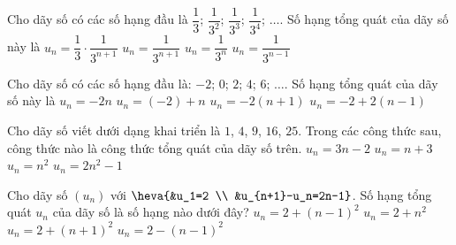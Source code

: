 \begin{ex}%
	Cho dãy  số có các số hạng đầu là
	$\dfrac{1}{3}$; $\dfrac{1}{3^2}$; $\dfrac{1}{3^3}$; $\dfrac{1}{3^4}$; $\ldots$. Số hạng tổng quát của  dãy số này là
	 \choice
		{$u_n=\dfrac{1}{3} \cdot  \dfrac{1}{3^{n+1}}$}
		{$u_n=\dfrac{1}{3^{n+1}}$} 
		 {\True $u_n=\dfrac{1}{3^n}$}
		 {$u_n=\dfrac{1}{3^{n-1}}$}
\end{ex}

\begin{ex}%
	Cho dãy số có các số hạng đầu là: $-2$; $0$; $2$; $4$; $6$; $\ldots$. Số hạng tổng quát  của dãy số này là
	\choice 
		 {$u_n=-2n$}
		{$u_n=(-2)+n$} 
		 {$u_n=-2(n+1)$}
		{\True  $u_n=-2+2(n-1)$}
\end{ex}

\begin{ex}%
	Cho dãy số viết dưới  dạng khai triển là $1$, $4$, $9$, $16$, $25$. Trong các công thức sau, công thức nào là công thức tổng quát của dãy số trên.
	\choice 
		{$u_n =  3n - 2$}
		{$u_n =  n + 3$}
		{\True $u_n = n^2$} 
		{$u_n = 2n^2 - 1$} 
\end{ex}

\begin{ex}%
	Cho  dãy số $(u_n)$ với $\heva{&u_1=2 \\ &u_{n+1}-u_n=2n-1}$. Số hạng tổng quát $u_n$ của dãy số là số hạng nào dưới đây?
	\choice 
		 {\True $u_n=2+(n-1)^2$}
		 {$u_n=2+n^2$}
		{$u_n=2+(n+1)^2$} 
		 {$u_n=2-(n-1)^2$}
\end{ex}


